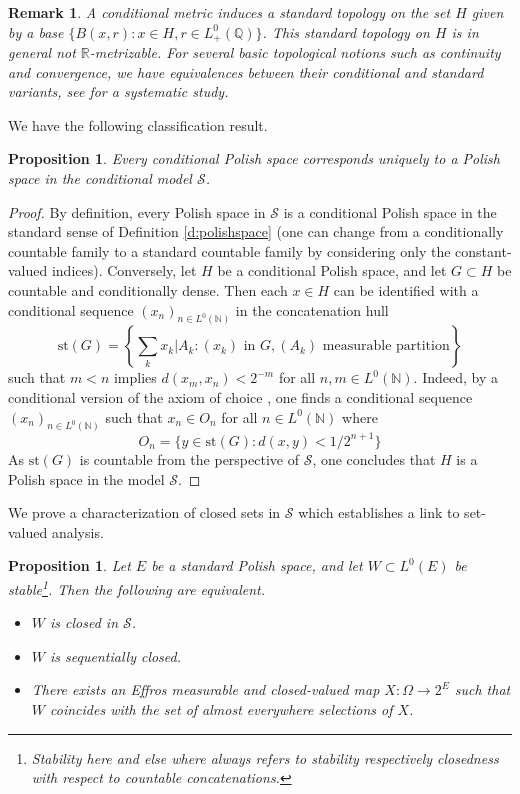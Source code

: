 \documentclass{jloganal}
\numberwithin{equation}{section}
\theoremstyle{plain}
\newtheorem{proposition}[subsection]{Proposition}
\newtheorem{remark}[subsection]{Remark}
\newcommand\N{\mathbb{N}}
\begin{document}
\begin{remark}
A conditional metric induces a standard topology on the \emph{set} $H$ given by a base $\{B(x,r)\colon x\in H, r\in L^0_+(\mathbb{Q})\}$.   
This standard topology on $H$ is in general not $\mathbb{R}$-metrizable.  
For several basic topological notions such as continuity and convergence, we have equivalences between their conditional and standard variants, see \cite[Section 3]{drapeau2016algebra} for a systematic study.  
\end{remark}
We have the following classification result. 
\begin{proposition}\label{p:condmetric}
Every conditional Polish space corresponds uniquely to a Polish space in the conditional model $\mathcal{S}$. 
\end{proposition}
\begin{proof}
By definition, every Polish space in $\mathcal{S}$ is a conditional Polish space in the standard sense of Definition \ref{d:polishspace} (one can change from a conditionally countable family to a standard countable family by considering only the constant-valued indices). 
Conversely, let $H$ be a conditional Polish space, and let $G\subset H$ be countable and conditionally dense. 
Then each $x\in H$ can be identified with a conditional sequence $(x_n)_{n\in L^0(\N)}$ in the concatenation hull 
\[
\text{st}(G)=\left\{\sum_k x_k|A_k\colon (x_k) \text{ in } G, (A_k) \text{ measurable partition}\right\}
\]
such that $m<n$ implies $d(x_m,x_n)<2^{-m}$ for all $n,m\in L^0(\N)$.  
Indeed,  by a conditional version of the axiom of choice \cite[Theorem 2.26]{drapeau2016algebra}, one finds a conditional sequence $(x_n)_{n\in L^0(\N)}$ such that $x_n\in O_n$ for all $n\in L^0(\N)$ where 
\[
O_n=\{y\in \text{st}(G)\colon d(x,y)<1/2^{n+1}\}
\]   
As $\text{st}(G)$ is countable from the perspective of $\mathcal{S}$, one concludes that $H$ is a Polish space in the model $ \mathcal{S}$. 
\end{proof}
We prove a characterization of closed sets in $\mathcal{S}$ which establishes a link to set-valued analysis.  
\begin{proposition}
Let $E$ be a standard Polish space, and let $W\subset L^0(E)$ be stable\footnote{Stability here and else where always refers to stability respectively closedness with respect to countable concatenations.}.  
Then the following are equivalent.  
\begin{itemize}
\item[(i)] $W$ is closed in $\mathcal{S}$.
\item[(ii)] $W$ is sequentially closed.   
\item[(iii)] There exists an Effros measurable and closed-valued map $X\colon \Omega\to 2^E$ such that $W$ coincides with the set of almost everywhere selections of $X$.   
\end{itemize}
\end{proposition}
\end{document}
